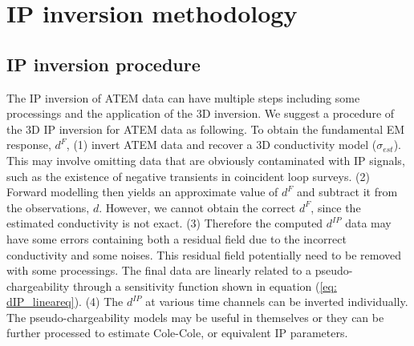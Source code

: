 \documentclass[a4paper, 11pt]{article}
\newcommand{\dip}{d^{IP}}
\begin{document}

\section{IP inversion methodology}

\subsection{IP inversion procedure}
The IP inversion of ATEM data can have multiple steps including some processings and the application of the 3D inversion. We suggest a procedure of the 3D IP inversion for ATEM data as following.
To obtain the fundamental EM response, $d^F$, (1) invert ATEM data and recover a 3D conductivity model ($\sigma_{est}$). 
This may involve omitting data that are obviously contaminated with IP signals, such as the existence of negative transients in coincident loop surveys. 
(2) Forward modelling then yields an approximate value of $d^F$ and subtract it from the observations, $d$. 
However, we cannot obtain the correct $d^F$, since the estimated conductivity is not exact. 
(3) Therefore the computed $\dip$ data may have some errors containing both a residual field due to the incorrect conductivity and some noises. This residual field potentially need to be removed with some processings. 
The final data are linearly related to a pseudo-chargeability through a sensitivity function shown in equation (\ref{eq: dIP_lineareq}). 
(4) The $\dip$ at various time channels can be inverted individually. The pseudo-chargeability models may be useful in themselves or they can be further processed to estimate Cole-Cole, or equivalent IP parameters.

\end{document}
